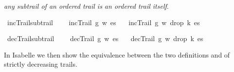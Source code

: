 \begin{isabellebody}
\begin{isamarkuptext}
{\em any subtrail of an ordered trail is an ordered trail itself}.%
\end{isamarkuptext}\isamarkuptrue%
\isamarkupfalse%
\ incTrail{\isacharunderscore}subtrail{\isacharcolon}\ \isanewline
\ \ \ {\isachardoublequoteopen}incTrail\ g\ w\ es{\isachardoublequoteclose}\isanewline
\ \ \ {\isachardoublequoteopen}incTrail\ g\ w\ {\isacharparenleft}drop\ k\ es{\isacharparenright}{\isachardoublequoteclose}%
\isadelimproof
%
\endisadelimproof
%
\isatagproof
%
\endisatagproof
{\isafoldproof}%
%
\isadelimproof
%
\endisadelimproof
%
\begin{isamarkuptext}%
%
\end{isamarkuptext}\isamarkuptrue%
\isamarkupfalse%
\ decTrail{\isacharunderscore}subtrail{\isacharcolon}\ \isanewline
\ \ \ {\isachardoublequoteopen}decTrail\ g\ w\ es{\isachardoublequoteclose}\isanewline
\ \ \ {\isachardoublequoteopen}decTrail\ g\ w\ {\isacharparenleft}drop\ k\ es{\isacharparenright}{\isachardoublequoteclose}%
\isadelimproof
%
\endisadelimproof
%
\isatagproof
%
\endisatagproof
{\isafoldproof}%
%
\isadelimproof
%
\endisadelimproof
%
\isadelimproof
%
\endisadelimproof
%
\isatagproof
%
\endisatagproof
{\isafoldproof}%
%
\isadelimproof
%
\endisadelimproof
%
\isadelimproof
%
\endisadelimproof
%
\isatagproof
%
\endisatagproof
{\isafoldproof}%
%
\isadelimproof
%
\endisadelimproof
%
\isadelimproof
%
\endisadelimproof
%
\isatagproof
%
\endisatagproof
{\isafoldproof}%
%
\isadelimproof
%
\endisadelimproof
%
\isadelimproof
%
\endisadelimproof
%
\isatagproof
%
\endisatagproof
{\isafoldproof}%
%
\isadelimproof
%
\endisadelimproof
%
\isadelimproof
%
\endisadelimproof
%
\isatagproof
%
\endisatagproof
{\isafoldproof}%
%
\isadelimproof
%
\endisadelimproof
%
\isadelimproof
%
\endisadelimproof
%
\isatagproof
%
\endisatagproof
{\isafoldproof}%
%
\isadelimproof
%
\endisadelimproof
%
\isadelimproof
%
\endisadelimproof
%
\isatagproof
%
\endisatagproof
{\isafoldproof}%
%
\isadelimproof
%
\endisadelimproof
%
\isadelimproof
%
\endisadelimproof
%
\isatagproof
%
\endisatagproof
{\isafoldproof}%
%
\isadelimproof
%
\endisadelimproof
%
\isadelimproof
%
\endisadelimproof
%
\isatagproof
%
\endisatagproof
{\isafoldproof}%
%
\isadelimproof
%
\endisadelimproof
%
\isadelimproof
%
\endisadelimproof
%
\isatagproof
%
\endisatagproof
{\isafoldproof}%
%
\isadelimproof
%
\endisadelimproof
%
\begin{isamarkuptext}%
In Isabelle we then show the equivalence between the two definitions  and  of strictly decreasing trails.

\end{isamarkuptext}
\end{isabellebody}
